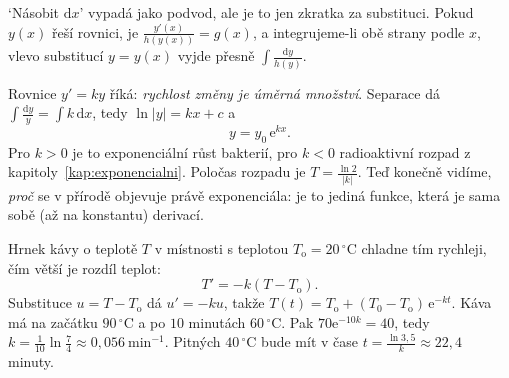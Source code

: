 `Násobit $\mathrm{d}x$' vypadá jako podvod, ale je to jen zkratka za substituci. Pokud $y(x)$ řeší rovnici, je $\frac{y'(x)}{h(y(x))} = g(x)$, a integrujeme-li obě strany podle $x$, vlevo substitucí $y = y(x)$ vyjde přesně $\int\frac{\mathrm{d}y}{h(y)}$.

\begin{example}
  Rovnice $y' = ky$ říká: \textit{rychlost změny je úměrná množství}. Separace dá $\int\frac{\mathrm{d}y}{y} = \int k\,\mathrm{d}x$, tedy $\ln|y| = kx + c$ a
  \begin{equation*}
    y = y_0\,\mathrm{e}^{kx}.
  \end{equation*}
  Pro $k > 0$ je to exponenciální růst bakterií, pro $k < 0$ radioaktivní rozpad z kapitoly~\ref{kap:exponencialni}. Poločas rozpadu je $T = \frac{\ln 2}{|k|}$. Teď konečně vidíme, \textit{proč} se v přírodě objevuje právě exponenciála: je to jediná funkce, která je sama sobě (až na konstantu) derivací.
\end{example}

\begin{example}
  Hrnek kávy o teplotě $T$ v místnosti s teplotou $T_\mathrm{o} = 20\,^\circ$C chladne tím rychleji, čím větší je rozdíl teplot:
  \begin{equation*}
    T' = -k(T - T_\mathrm{o}).
  \end{equation*}
  Substituce $u = T - T_\mathrm{o}$ dá $u' = -ku$, takže $T(t) = T_\mathrm{o} + (T_0 - T_\mathrm{o})\,\mathrm{e}^{-kt}$. Káva má na začátku $90\,^\circ$C a po $10$ minutách $60\,^\circ$C. Pak $70\mathrm{e}^{-10k} = 40$, tedy $k = \frac{1}{10}\ln\frac{7}{4}\approx 0{,}056\ \mathrm{min}^{-1}$. Pitných $40\,^\circ$C bude mít v čase $t = \frac{\ln 3{,}5}{k}\approx 22{,}4$ minuty.
\end{example}

\begin{center}
\end{center}

